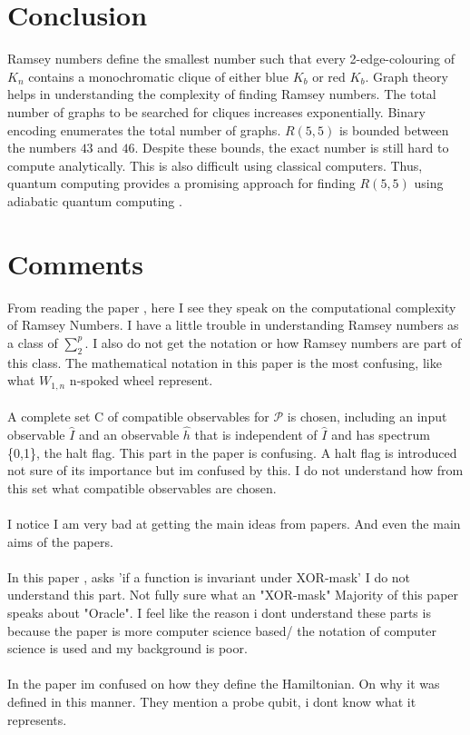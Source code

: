 \documentclass{Assignment}
\begin{document}
\section{Conclusion}
Ramsey numbers define the smallest number such that every 2-edge-colouring of $K_n$ contains a monochromatic clique of either blue $K_b$ or red $K_b$.
Graph theory helps in understanding the complexity of finding Ramsey numbers.
The total number of graphs to be searched for cliques increases exponentially.
Binary encoding enumerates the total number of graphs.
$R(5,5)$ is bounded between the numbers $43$ and $46$.
Despite these bounds, the exact number is still hard to compute analytically.
This is also difficult using classical computers.
Thus, quantum computing provides a promising approach for finding $R(5,5)$ using adiabatic quantum computing \cite{PhysRevA.93.032301}.
\newpage
\section*{Comments}




From reading the paper \cite{burr1981generalized}, here I see they speak on the computational complexity of Ramsey Numbers. 
I have a little trouble in understanding Ramsey numbers as a class of $\sum_{2}^{p}$. 
I also do not get the notation or how Ramsey numbers are part of this class.
The mathematical notation in this paper is the most confusing, like what $W_{1,n}$ n-spoked wheel represent.
\\
\\
\cite{Deutsch1989}
A complete set C of compatible observables for $\mathcal{P}$ is chosen, including an input 
observable $\hat{I}$ and an observable $\hat{h}$ that is independent of $\hat{I}$ and has spectrum \{0,1\}, the halt flag. 
This part in the paper is confusing.
A halt flag is introduced not sure of its importance but im confused by this.
I do not understand how from this set what compatible observables are chosen.
\\
\\
I notice I am very bad at getting the main ideas from papers.
And even the main aims of the papers.
\\
\\
In this paper \cite{doi:10.1137/S0097539796298637}, asks 'if a function is invariant under XOR-mask' I do not understand this part.
Not fully sure what an "XOR-mask"
Majority of this paper speaks about "Oracle".
I feel like the reason i dont understand these parts is because the paper is more computer science based/ the notation of computer science is used and my background is poor. 
\\\\
In the paper \cite{PhysRevA.93.032301} im confused on how they define the Hamiltonian. 
On why it was defined in this manner.
They mention a probe qubit, i dont know what it represents.
\end{document}
